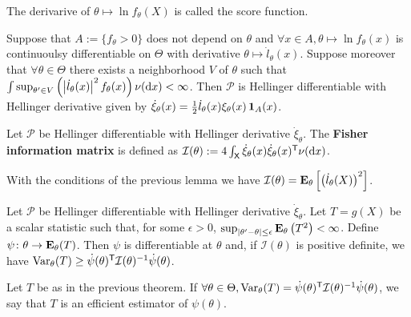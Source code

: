 	The derivarive of $\theta \mapsto \ln f_\theta(X)$ is  called the score function.
	
	\begin{lem}
		Suppose that $A := \{ f_\theta > 0 \}$ does not depend on $\theta$ and $\forall x \in A, \theta \mapsto \ln f_\theta(x)$ is continuoulsy differentiable on $\Theta$ with derivative $\theta \mapsto \dot{l}_\theta(x)$.
		Suppose moreover that $\forall \theta \in \Theta$ there exists a neighborhood $V$ of $\theta$ such that $\int \sup_{\theta' \in V} \left( \left\lvert\dot{l}_\theta(x)\right\rvert^2 f_\theta(x) \right) \nu(\mathop{}\mathopen{}\mathrm{d} x) < \infty$.
		Then $\mathcal{P}$ is Hellinger differentiable with Hellinger derivative given by $\dot{\xi}_\theta(x) = \frac{1}{2} \dot{l}_\theta(x) \xi_\theta(x) \operatorname{\mathbf{1}}_A(x)$.
	\end{lem}

	\begin{defn}
		Let $\mathcal{P}$ be Hellinger differentiable with Hellinger derivative $\dot{\xi}_\theta$.
		The \textbf{Fisher information matrix} is defined as $\mathcal{I}(\theta) := 4 \int_{\mathsf{X}} \dot{\xi}_\theta(x) \dot{\xi}_\theta(x)^\mathsf{T} \nu (\mathop{}\mathopen{}\mathrm{d} x)$.
	\end{defn}

	With the conditions of the previous lemma we have $\mathcal{I}(\theta) = \mathbf{E}_\theta \left[ \left( \dot{l}_\theta(X) \right)^2 \right]$.
	
	\begin{thm}
		Let $\mathcal{P}$ be Hellinger differentiable with Hellinger derivative $\dot{\xi}_\theta$.
		Let $T = g(X)$ be a scalar statistic such that, for some $\epsilon > 0$, $\sup_{\left\lvert\theta' - \theta\right\rvert \leq \epsilon} \mathbf{E}_{\theta} \left( T^2 \right) < \infty$.
		Define $\psi \colon \theta \to \mathbf{E}_\theta(T)$.
		Then $\psi$ is differentiable at $\theta$ and, if $\mathcal{I}(\theta)$ is positive definite, we have $\operatorname{Var}_\theta(T) \geq \dot{\psi}(\theta)^\mathsf{T} \mathcal{I}(\theta)^{-1} \dot{\psi}(\theta)$.
	\end{thm}
	
	\begin{defn}
		Let $T$ be as in the previous theorem.
		If $\forall \theta \in \Theta, \operatorname{Var}_\theta(T) = \dot{\psi}(\theta)^\mathsf{T} \mathcal{I}(\theta)^{-1} \dot{\psi}(\theta)$, we say that $T$ is an efficient estimator of $\psi(\theta)$.
	\end{defn}
